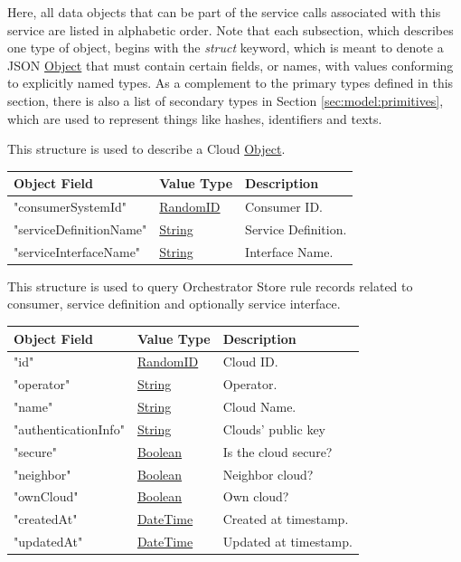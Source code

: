 \documentclass[a4paper]{arrowhead}
\newcommand{\pref}[1]{{\textcolor{ArrowheadGrey}{\hyperref[sec:model:primitives:#1]{#1}}}}
\begin{document}
Here, all data objects that can be part of the service calls associated with this service are listed in alphabetic order.
Note that each subsection, which describes one type of object, begins with the \textit{struct} keyword, which is meant to denote a JSON \pref{Object} that must contain certain fields, or names, with values conforming to explicitly named types.
As a complement to the primary types defined in this section, there is also a list of secondary types in Section \ref{sec:model:primitives}, which are used to represent things like hashes, identifiers and texts.


This structure is used to describe a Cloud \pref{Object}.

\begin{table}[ht!]
\begin{tabularx}{\textwidth}{| p{5cm} | p{5cm} | X |} \hline
\rowcolor{gray!33} Object Field & Value Type      & Description \\ \hline
"consumerSystemId"                & \pref{RandomID}     & Consumer ID. \\ \hline
"serviceDefinitionName"            & \pref{String}     & Service Definition. \\ \hline
"serviceInterfaceName"           & \pref{String}    & Interface Name. \\ \hline

\end{tabularx}
\end{table}



This structure is used to query Orchestrator Store rule records related to consumer, service definition and optionally service interface.

\begin{table}[ht!]
\begin{tabularx}{\textwidth}{| p{5cm} | p{5cm} | X |} \hline
\rowcolor{gray!33} Object Field & Value Type      & Description \\ \hline
"id"                  & \pref{RandomID}     & Cloud ID. \\ \hline
"operator"            & \pref{String}       & Operator. \\ \hline
"name"                & \pref{String}       & Cloud Name. \\ \hline
"authenticationInfo"  & \pref{String}       & Clouds' public key \\ \hline
"secure"              & \pref{Boolean}      & Is the cloud secure? \\ \hline
"neighbor"            & \pref{Boolean}      & Neighbor cloud? \\ \hline
"ownCloud"            & \pref{Boolean}      & Own cloud? \\ \hline
"createdAt"           & \pref{DateTime}     & Created at timestamp. \\ \hline
"updatedAt"           & \pref{DateTime}     & Updated at timestamp. \\ \hline


\end{tabularx}
\end{table}
\end{document}
